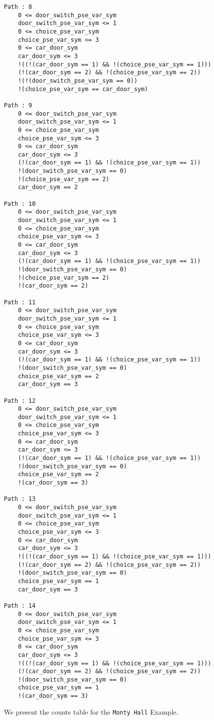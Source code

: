 \documentclass{article}
\begin{document}
\begin{verbatim}
Path : 8
	0 <= door_switch_pse_var_sym
	door_switch_pse_var_sym <= 1
	0 <= choice_pse_var_sym
	choice_pse_var_sym <= 3
	0 <= car_door_sym
	car_door_sym <= 3
	!((!(car_door_sym == 1) && !(choice_pse_var_sym == 1)))
	(!(car_door_sym == 2) && !(choice_pse_var_sym == 2))
	!(!(door_switch_pse_var_sym == 0))
	!(choice_pse_var_sym == car_door_sym)
	
Path : 9
	0 <= door_switch_pse_var_sym
	door_switch_pse_var_sym <= 1
	0 <= choice_pse_var_sym
	choice_pse_var_sym <= 3
	0 <= car_door_sym
	car_door_sym <= 3
	(!(car_door_sym == 1) && !(choice_pse_var_sym == 1))
	!(door_switch_pse_var_sym == 0)
	!(choice_pse_var_sym == 2)
	car_door_sym == 2
	
Path : 10
	0 <= door_switch_pse_var_sym
	door_switch_pse_var_sym <= 1
	0 <= choice_pse_var_sym
	choice_pse_var_sym <= 3
	0 <= car_door_sym
	car_door_sym <= 3
	(!(car_door_sym == 1) && !(choice_pse_var_sym == 1))
	!(door_switch_pse_var_sym == 0)
	!(choice_pse_var_sym == 2)
	!(car_door_sym == 2)
	
Path : 11
	0 <= door_switch_pse_var_sym
	door_switch_pse_var_sym <= 1
	0 <= choice_pse_var_sym
	choice_pse_var_sym <= 3
	0 <= car_door_sym
	car_door_sym <= 3
	(!(car_door_sym == 1) && !(choice_pse_var_sym == 1))
	!(door_switch_pse_var_sym == 0)
	choice_pse_var_sym == 2
	car_door_sym == 3
	
Path : 12
	0 <= door_switch_pse_var_sym
	door_switch_pse_var_sym <= 1
	0 <= choice_pse_var_sym
	choice_pse_var_sym <= 3
	0 <= car_door_sym
	car_door_sym <= 3
	(!(car_door_sym == 1) && !(choice_pse_var_sym == 1))
	!(door_switch_pse_var_sym == 0)
	choice_pse_var_sym == 2
	!(car_door_sym == 3)
	
Path : 13
	0 <= door_switch_pse_var_sym
	door_switch_pse_var_sym <= 1
	0 <= choice_pse_var_sym
	choice_pse_var_sym <= 3
	0 <= car_door_sym
	car_door_sym <= 3
	!((!(car_door_sym == 1) && !(choice_pse_var_sym == 1)))
	(!(car_door_sym == 2) && !(choice_pse_var_sym == 2))
	!(door_switch_pse_var_sym == 0)
	choice_pse_var_sym == 1
	car_door_sym == 3
	
Path : 14
	0 <= door_switch_pse_var_sym
	door_switch_pse_var_sym <= 1
	0 <= choice_pse_var_sym
	choice_pse_var_sym <= 3
	0 <= car_door_sym
	car_door_sym <= 3
	!((!(car_door_sym == 1) && !(choice_pse_var_sym == 1)))
	(!(car_door_sym == 2) && !(choice_pse_var_sym == 2))
	!(door_switch_pse_var_sym == 0)
	choice_pse_var_sym == 1
	!(car_door_sym == 3)
	\end{verbatim}

We present the counts table for the \texttt{Monty Hall} Example. 
\end{document}
